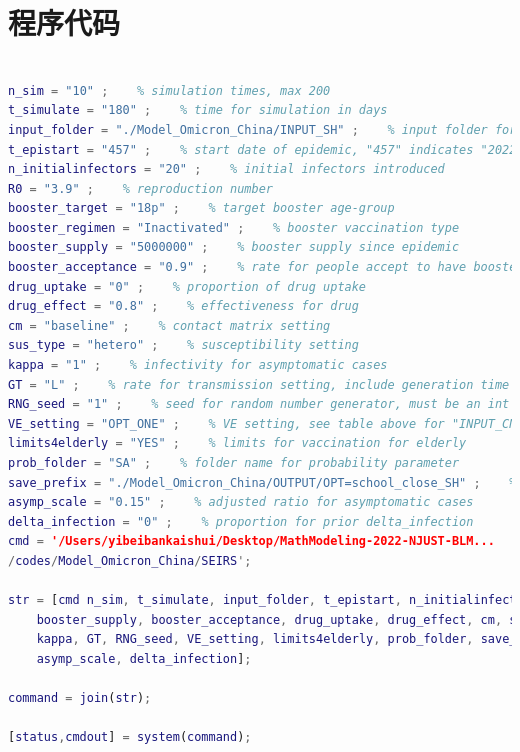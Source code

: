\documentclass[bwprint]{gmcmthesis}
\numberwithin{figure}{section}
\begin{document}
\section{程序代码}
\begin{lstlisting}[language=Matlab] 
% 主函数

n_sim = "10" ;    % simulation times, max 200
t_simulate = "180" ;    % time for simulation in days
input_folder = "./Model_Omicron_China/INPUT_SH" ;    % input folder for parameters
t_epistart = "457" ;    % start date of epidemic, "457" indicates "2022-03-01"
n_initialinfectors = "20" ;    % initial infectors introduced
R0 = "3.9" ;    % reproduction number
booster_target = "18p" ;    % target booster age-group
booster_regimen = "Inactivated" ;    % booster vaccination type
booster_supply = "5000000" ;    % booster supply since epidemic
booster_acceptance = "0.9" ;    % rate for people accept to have booster shot
drug_uptake = "0" ;    % proportion of drug uptake
drug_effect = "0.8" ;    % effectiveness for drug
cm = "baseline" ;    % contact matrix setting
sus_type = "hetero" ;    % susceptibility setting
kappa = "1" ;    % infectivity for asymptomatic cases
GT = "L" ;    % rate for transmission setting, include generation time
RNG_seed = "1" ;    % seed for random number generator, must be an int
VE_setting = "OPT_ONE" ;    % VE setting, see table above for "INPUT_CN"
limits4elderly = "YES" ;    % limits for vaccination for elderly
prob_folder = "SA" ;    % folder name for probability parameter
save_prefix = "./Model_Omicron_China/OUTPUT/OPT=school_close_SH" ;    % save path prefix
asymp_scale = "0.15" ;    % adjusted ratio for asymptomatic cases
delta_infection = "0" ;    % proportion for prior delta_infection
cmd = '/Users/yibeibankaishui/Desktop/MathModeling-2022-NJUST-BLM...
/codes/Model_Omicron_China/SEIRS';

str = [cmd n_sim, t_simulate, input_folder, t_epistart, n_initialinfectors, R0, booster_target, booster_regimen,... 
    booster_supply, booster_acceptance, drug_uptake, drug_effect, cm, sus_type, ...
    kappa, GT, RNG_seed, VE_setting, limits4elderly, prob_folder, save_prefix, ...
    asymp_scale, delta_infection];

command = join(str);

[status,cmdout] = system(command);

 \end{lstlisting}
 
\end{document}

